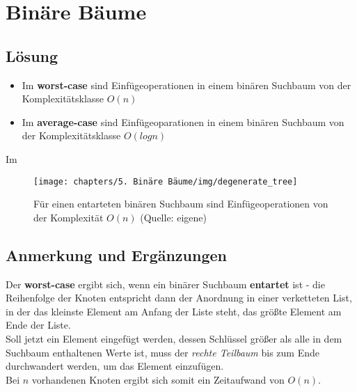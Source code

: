 \chapter{Binäre Bäume}

\section{Lösung}

\begin{itemize}
    \item Im \textbf{worst-case} sind Einfügeoperationen in einem binären Suchbaum von der Komplexitätsklasse $O(n)$
    \item Im \textbf{average-case} sind Einfügeoparationen in einem binären Suchbaum von der Komplexitätsklasse $O(log n)$
\end{itemize}

Im \textbf{}


\begin{figure}
    \begin{center}
        \texttt{[image: chapters/5. Binäre Bäume/img/degenerate\_tree]}
        \caption{Für einen entarteten binären Suchbaum sind Einfügeoperationen von der Komplexität $O(n)$ (Quelle: eigene)}
        \label{fig:degeneratetree}
    \end{center}
\end{figure}

\section{Anmerkung und Ergänzungen}

Der \textbf{worst-case} ergibt sich, wenn ein binärer Suchbaum \textbf{entartet} ist - die Reihenfolge der Knoten entspricht dann der Anordnung in einer verketteten List, in der das kleinste Element am Anfang der Liste steht, das größte Element am Ende der Liste.\\
Soll jetzt ein Element eingefügt werden, dessen Schlüssel größer als alle in dem Suchbaum enthaltenen Werte ist, muss der \textit{rechte Teilbaum} bis zum Ende durchwandert werden, um das Element einzufügen.\\
Bei $n$ vorhandenen Knoten ergibt sich somit ein Zeitaufwand von $O(n)$.\\




























